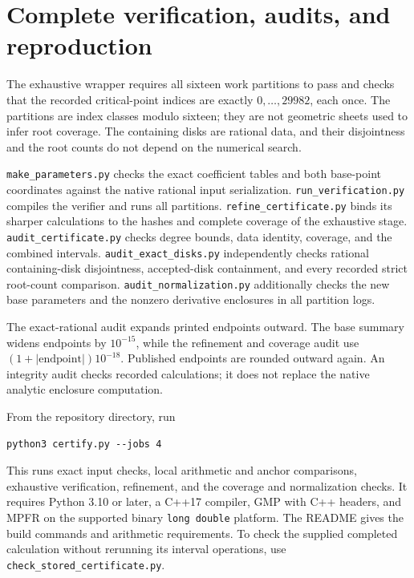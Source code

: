 \documentclass[11pt,a4paper]{article}
\newcommand{\file}[1]{\textnormal{\small\ttfamily\nolinkurl{#1}}}
\begin{document}
\section{Complete verification, audits, and reproduction}\label{sec:reproduce}
The exhaustive wrapper requires all sixteen work partitions to pass and
checks that the recorded critical-point indices are exactly
$0,\ldots,29982$, each once. The partitions are index classes modulo sixteen;
they are not geometric sheets used to infer root coverage.
The containing disks are rational data, and their disjointness and the root
counts do not depend on the numerical search.

\file{make_parameters.py} checks the exact coefficient tables and both
base-point coordinates against the native rational input serialization.
\file{run_verification.py} compiles the verifier and runs all partitions.
\file{refine_certificate.py} binds its sharper calculations to the hashes and
complete coverage of the exhaustive stage. \file{audit_certificate.py}
checks degree bounds, data identity, coverage, and the combined intervals.
\file{audit_exact_disks.py} independently checks rational containing-disk
disjointness, accepted-disk containment, and every recorded strict root-count
comparison. \file{audit_normalization.py} additionally checks the new base
parameters and the nonzero derivative enclosures in all partition logs.

The exact-rational audit expands printed endpoints outward. The base summary
widens endpoints by $10^{-15}$, while the refinement and coverage audit use
$(1+|\mathrm{endpoint}|)10^{-18}$. Published endpoints are rounded outward
again. An integrity audit checks recorded calculations; it does not replace
the native analytic enclosure computation.



From the repository directory, run
\begin{lstlisting}
python3 certify.py --jobs 4
\end{lstlisting}
This runs exact input checks, local arithmetic and anchor comparisons,
exhaustive verification, refinement, and the coverage and normalization
checks. It requires Python 3.10 or later, a C++17 compiler, GMP with C++
headers, and MPFR on the supported binary \texttt{long double} platform.
The README gives the build commands and arithmetic requirements.
To check the supplied completed calculation without rerunning its interval
operations, use \file{check_stored_certificate.py}.
\end{document}
